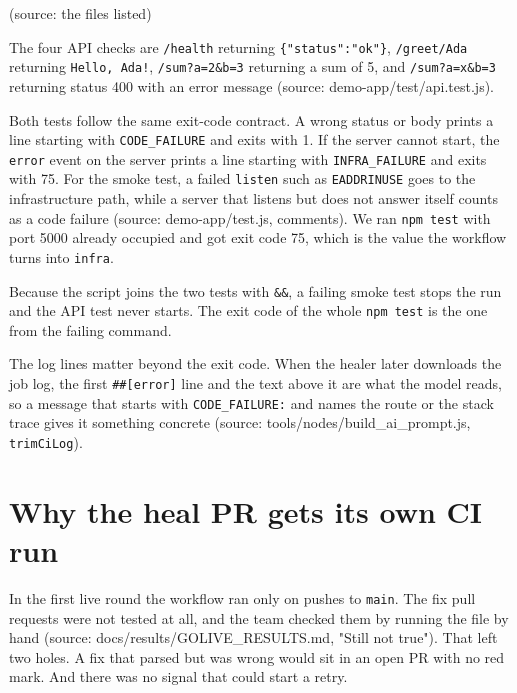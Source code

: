 (source: the files listed)

The four API checks are \texttt{/\allowbreak{}health} returning \texttt{\{"status":\allowbreak{}"ok"\}}, \texttt{/\allowbreak{}greet/\allowbreak{}Ada} returning \texttt{Hello, Ada!}, \texttt{/\allowbreak{}sum?a=2\&b=3} returning a sum of 5, and \texttt{/\allowbreak{}sum?a=x\&b=3} returning status 400 with an error message (source: demo-app/\allowbreak{}test/\allowbreak{}api.test.js).

Both tests follow the same exit-code contract. A wrong status or body prints a line starting with \texttt{CODE\_\allowbreak{}FAILURE} and exits with 1. If the server cannot start, the \texttt{error} event on the server prints a line starting with \texttt{INFRA\_\allowbreak{}FAILURE} and exits with 75. For the smoke test, a failed \texttt{listen} such as \texttt{EADDRINUSE} goes to the infrastructure path, while a server that listens but does not answer itself counts as a code failure (source: demo-app/\allowbreak{}test.js, comments). We ran \texttt{npm test} with port 5000 already occupied and got exit code 75, which is the value the workflow turns into \texttt{infra}.

Because the script joins the two tests with \texttt{\&\&}, a failing smoke test stops the run and the API test never starts. The exit code of the whole \texttt{npm test} is the one from the failing command.

The log lines matter beyond the exit code. When the healer later downloads the job log, the first \texttt{\#\#[error]} line and the text above it are what the model reads, so a message that starts with \texttt{CODE\_\allowbreak{}FAILURE:\allowbreak{}} and names the route or the stack trace gives it something concrete (source: tools/\allowbreak{}nodes/\allowbreak{}build\_\allowbreak{}ai\_\allowbreak{}prompt.js, \texttt{trimCiLog}).

\section{Why the heal PR gets its own CI run}

In the first live round the workflow ran only on pushes to \texttt{main}. The fix pull requests were not tested at all, and the team checked them by running the file by hand (source: docs/\allowbreak{}results/\allowbreak{}GOLIVE\_\allowbreak{}RESULTS.md, "Still not true"). That left two holes. A fix that parsed but was wrong would sit in an open PR with no red mark. And there was no signal that could start a retry.

